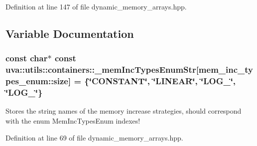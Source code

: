 Definition at line 147 of file dynamic\+\_\+memory\+\_\+arrays.\+hpp.



\subsection{Variable Documentation}
\hypertarget{namespaceuva_1_1utils_1_1containers_af8fa681c6894f17bfa25c736eb3d8ce8}{}
\subsubsection[{\+\_\+mem\+Inc\+Types\+Enum\+Str}]{\setlength{\rightskip}{0pt plus 5cm}const char$\ast$ const uva\+::utils\+::containers\+::\+\_\+mem\+Inc\+Types\+Enum\+Str\mbox{[}mem\+\_\+inc\+\_\+types\+\_\+enum\+::size\mbox{]} = \{\char`\"{}C\+O\+N\+S\+T\+A\+N\+T\char`\"{}, \char`\"{}{\bf L\+I\+N\+E\+A\+R}\char`\"{}, \char`\"{}{\bf L\+O\+G\+\_}\char`\"{}, \char`\"{}{\bf L\+O\+G\+\_}\char`\"{}\}}\label{namespaceuva_1_1utils_1_1containers_af8fa681c6894f17bfa25c736eb3d8ce8}
Stores the string names of the memory increase strategies, should correspond with the enum Mem\+Inc\+Types\+Enum indexes! 

Definition at line 69 of file dynamic\+\_\+memory\+\_\+arrays.\+hpp.

